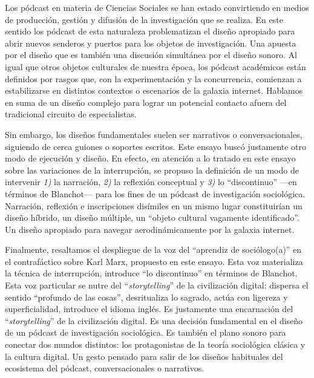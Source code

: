 \documentclass[
  spanish,
  11pt,
  a4paper,
]{scrbook}
\begin{document}
Los pódcast en materia de Ciencias Sociales se han estado convirtiendo
en medios de producción, gestión y difusión de la investigación que se
realiza. En este sentido los pódcast de esta naturaleza problematizan el
diseño apropiado para abrir nuevos senderos y puertos para los objetos
de investigación. Una apuesta por el diseño que es también una discusión
simultánea por el diseño sonoro. Al igual que otros objetos culturales
de nuestra época, los pódcast académicos están definidos por rasgos que,
con la experimentación y la concurrencia, comienzan a estabilizarse en
distintos contextos o escenarios de la galaxia internet. Hablamos en
suma de un diseño complejo para lograr un potencial contacto afuera del
tradicional circuito de especialistas.

Sin embargo, los diseños fundamentales suelen ser narrativos o
conversacionales, siguiendo de cerca guiones o soportes escritos. Este
ensayo buscó justamente otro modo de ejecución y diseño. En efecto, en
atención a lo tratado en este ensayo sobre las variaciones de la
interrupción, se propuso la definición de un modo de intervenir
\emph{1)} la narración, \emph{2)} la reflexión conceptual y \emph{3)} lo
``discontinuo'' ---en términos de Blanchot--- para los fines de un
pódcast de investigación sociológica. Narración, reflexión e
inscripciones disímiles en un mismo lugar constituirían un diseño
híbrido, un diseño múltiple, un ``objeto cultural vagamente
identificado''. Un diseño apropiado para navegar aerodinámicamente por
la galaxia internet.

Finalmente, resaltamos el despliegue de la voz del ``aprendiz de
sociólogo(a)'' en el contrafáctico sobre Karl Marx, propuesto en este
ensayo. Esta voz materializa la técnica de interrupción, introduce ``lo
discontinuo'' en términos de Blanchot. Esta voz particular se nutre del
``\emph{storytelling}'' de la civilización digital: dispersa el sentido
``profundo de las cosas'', desritualiza lo sagrado, actúa con ligereza y
superficialidad, introduce el idioma inglés. Es justamente una
encarnación del ``\emph{storytelling}'' de la civilización digital. Es
una decisión fundamental en el diseño de un pódcast de investigación
sociológica. Es también el plano sonoro para conectar dos mundos
distintos: los protagonistas de la teoría sociológica clásica y la
cultura digital. Un gesto pensado para salir de los diseños habituales
del ecosistema del pódcast, conversacionales o narrativos.

\nocite{Perez2010, Perez2015, Perez2019}
\printbibliography[heading=subbibliography, title={Referencias Bibliográficas}]
\end{document}
